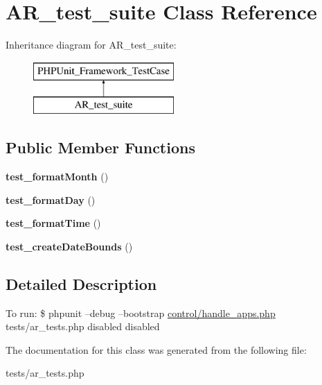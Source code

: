\hypertarget{classAR__test__suite}{\section{A\-R\-\_\-test\-\_\-suite Class Reference}
\label{classAR__test__suite}
}
Inheritance diagram for A\-R\-\_\-test\-\_\-suite\-:\begin{figure}[H]
\begin{center}
\leavevmode
\includegraphics[height=2.000000cm]{classAR__test__suite}
\end{center}
\end{figure}
\subsection*{Public Member Functions}
\begin{DoxyCompactItemize}
\item 
\hypertarget{classAR__test__suite_aa35b707ad07fb6f68e1a5c3f542bd2d9}{{\bfseries test\-\_\-format\-Month} ()}\label{classAR__test__suite_aa35b707ad07fb6f68e1a5c3f542bd2d9}

\item 
\hypertarget{classAR__test__suite_a7767e5f2899f34d98a46841acad7ea0a}{{\bfseries test\-\_\-format\-Day} ()}\label{classAR__test__suite_a7767e5f2899f34d98a46841acad7ea0a}

\item 
\hypertarget{classAR__test__suite_ad086344fb4ee3169f8a146abc641daed}{{\bfseries test\-\_\-format\-Time} ()}\label{classAR__test__suite_ad086344fb4ee3169f8a146abc641daed}

\item 
\hypertarget{classAR__test__suite_a36f2302b55a526e44443f79430d3a71b}{{\bfseries test\-\_\-create\-Date\-Bounds} ()}\label{classAR__test__suite_a36f2302b55a526e44443f79430d3a71b}

\end{DoxyCompactItemize}


\subsection{Detailed Description}
To run\-: \$ phpunit --debug --bootstrap \hyperlink{handle__apps_8php}{control/handle\-\_\-apps.\-php} tests/ar\-\_\-tests.\-php  disabled  disabled 

The documentation for this class was generated from the following file\-:\begin{DoxyCompactItemize}
\item 
tests/ar\-\_\-tests.\-php\end{DoxyCompactItemize}

